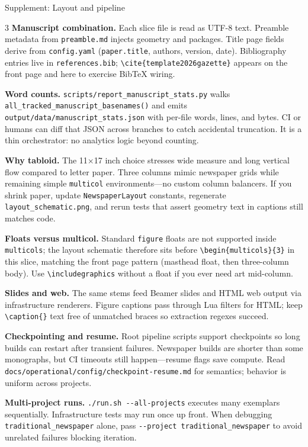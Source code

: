 \documentclass[
  ignorenonframetext,
]{beamer}
\begin{document}
\begin{frame}[fragile]{Supplement: Layout and pipeline}
\begin{multicols}{3}
\textbf{Manuscript combination.} Each slice file is read as UTF-8 text.
Preamble metadata from \texttt{preamble.md} injects geometry and
packages. Title page fields derive from \texttt{config.yaml}
(\texttt{paper.title}, authors, version, date). Bibliography entries
live in \texttt{references.bib};
\texttt{\textbackslash{}cite\{template2026gazette\}} appears on the
front page and here to exercise BibTeX wiring.

\textbf{Word counts.} \texttt{scripts/report\_manuscript\_stats.py}
walks \texttt{all\_tracked\_manuscript\_basenames()} and emits
\texttt{output/data/manuscript\_stats.json} with per-file words, lines,
and bytes. CI or humans can diff that JSON across branches to catch
accidental truncation. It is a thin orchestrator: no analytics logic
beyond counting.

\textbf{Why tabloid.} The 11×17 inch choice stresses wide measure and
long vertical flow compared to letter paper. Three columns mimic
newspaper grids while remaining simple \texttt{multicol}
environments---no custom column balancers. If you shrink paper, update
\texttt{NewspaperLayout} constants, regenerate
\texttt{layout\_schematic.png}, and rerun tests that assert geometry
text in captions still matches code.

\textbf{Floats versus multicol.} Standard \texttt{figure} floats are not
supported inside \texttt{multicols}; the layout schematic therefore sits
before \texttt{\textbackslash{}begin\{multicols\}\{3\}} in this slice,
matching the front page pattern (masthead float, then three-column
body). Use \texttt{\textbackslash{}includegraphics} without a float if
you ever need art mid-column.

\textbf{Slides and web.} The same stems feed Beamer slides and HTML web
output via infrastructure renderers. Figure captions pass through Lua
filters for HTML; keep \texttt{\textbackslash{}caption\{\}} text free of
unmatched braces so extraction regexes succeed.

\textbf{Checkpointing and resume.} Root pipeline scripts support
checkpoints so long builds can restart after transient failures.
Newspaper builds are shorter than some monographs, but CI timeouts still
happen---resume flags save compute. Read
\texttt{docs/operational/config/checkpoint-resume.md} for semantics;
behavior is uniform across projects.

\textbf{Multi-project runs.} \texttt{./run.sh\ -\/-all-projects}
executes many exemplars sequentially. Infrastructure tests may run once
up front. When debugging \texttt{traditional\_newspaper} alone, pass
\texttt{-\/-project\ traditional\_newspaper} to avoid unrelated failures
blocking iteration.


\end{multicols}
\end{frame}
\end{document}
